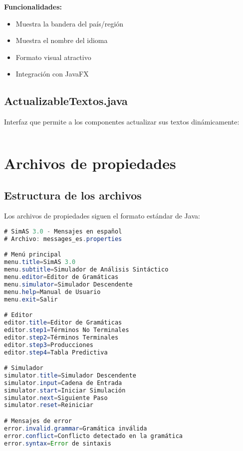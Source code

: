 \inputminted[linenos,breaklines]{java}{codigo/src/utils/LanguageListCell.java}

\textbf{Funcionalidades:}

\begin{itemize}
    \item Muestra la bandera del país/región
    \item Muestra el nombre del idioma
    \item Formato visual atractivo
    \item Integración con JavaFX
\end{itemize}

\subsection{ActualizableTextos.java}

Interfaz que permite a los componentes actualizar sus textos dinámicamente:

\inputminted[linenos,breaklines]{java}{codigo/src/utils/ActualizableTextos.java}

\section{Archivos de propiedades}

\subsection{Estructura de los archivos}

Los archivos de propiedades siguen el formato estándar de Java:

\begin{lstlisting}[language=Java, caption=Ejemplo de archivo de propiedades]
# SimAS 3.0 - Mensajes en español
# Archivo: messages_es.properties

# Menú principal
menu.title=SimAS 3.0
menu.subtitle=Simulador de Análisis Sintáctico
menu.editor=Editor de Gramáticas
menu.simulator=Simulador Descendente
menu.help=Manual de Usuario
menu.exit=Salir

# Editor
editor.title=Editor de Gramáticas
editor.step1=Términos No Terminales
editor.step2=Términos Terminales
editor.step3=Producciones
editor.step4=Tabla Predictiva

# Simulador
simulator.title=Simulador Descendente
simulator.input=Cadena de Entrada
simulator.start=Iniciar Simulación
simulator.next=Siguiente Paso
simulator.reset=Reiniciar

# Mensajes de error
error.invalid.grammar=Gramática inválida
error.conflict=Conflicto detectado en la gramática
error.syntax=Error de sintaxis
\end{lstlisting}


